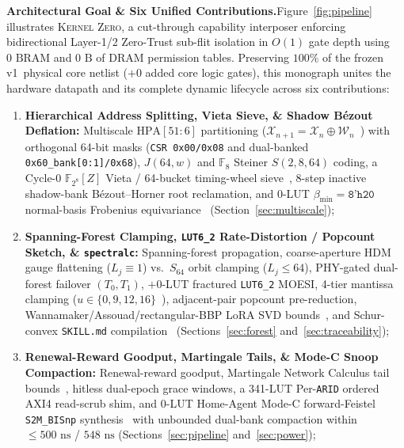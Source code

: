 \documentclass[11pt,letterpaper]{article}
\providecommand{\BaselineVersion}{v1}
\providecommand{\ScrubShimLuts}{341}
\providecommand{\ScrubShimPhysicalLUTs}{\ScrubShimLuts}
\theoremstyle{spectralthm}
\begin{document}
\noindent\textbf{Architectural Goal \& Six Unified Contributions.}\;Figure~\ref{fig:pipeline} illustrates \textsc{Kernel Zero}, a cut-through capability interposer enforcing bidirectional Layer-1/2 Zero-Trust sub-flit isolation in $O(1)$ gate depth using $0\text{~BRAM}$ and $0\text{~B}$ of DRAM permission tables. Preserving $100\%$ of the frozen \BaselineVersion\ physical core netlist ($+0$ added core logic gates), this monograph  unites the hardware datapath and its complete dynamic lifecycle across six contributions:
\begin{enumerate}
\renewcommand{\theenumi}{(\arabic{enumi})}\renewcommand{\labelenumi}{\theenumi}
  \item \textbf{Hierarchical Address Splitting, Vieta Sieve, \& Shadow B\'{e}zout Deflation:} Multiscale $\mathrm{HPA}[51:6]$ partitioning ($\mathcal{X}_{n+1} = \mathcal{X}_n \oplus \mathcal{W}_n$~\cite{chen2001multilevel}) with orthogonal 64-bit masks (\texttt{CSR 0x00/0x08} and dual-banked \texttt{0x60\_bank[0:1]/0x68}), $J(64,w)$ and $\mathbb{F}_8$ Steiner $S(2,8,64)$ coding, a Cycle-0 $\mathbb{F}_{2^8}[Z]$ Vieta / 64-bucket timing-wheel sieve~\cite{varghese1997timing}, 8-step inactive shadow-bank B\'{e}zout--Horner root reclamation, and 0-LUT $\beta_{\min}=\texttt{8'h20}$ normal-basis Frobenius equivariance~\cite{mullin1989optimal, lidl1997finite, diamond2025binius} (Section~\ref{sec:multiscale});
  \item \textbf{Spanning-Forest Clamping, \texttt{LUT6\_2} Rate-Distortion / Popcount Sketch, \& \texttt{spectralc}:} Spanning-forest propagation, coarse-aperture HDM gauge flattening ($L_j \equiv 1$) vs.\ $S_{64}$ orbit clamping ($L_j \le 64$), PHY-gated dual-forest failover $(T_0,T_1)$, $+0$-LUT fractured \mbox{\texttt{LUT6\_2}} MOESI, 4-tier mantissa clamping ($u \in \{0,9,12,16\}$~\cite{rouhani2023microscaling}), adjacent-pair popcount pre-reduction, Wannamaker/Assouad/rectangular-BBP LoRA SVD bounds~\cite{wannamaker2000nonsubtractive, benaych2012singular, assouad1983deux}, and Schur-convex \texttt{SKILL.md} compilation~\cite{mcconnell2011certifying, doe2025genesis} (Sections~\ref{sec:forest} and~\ref{sec:traceability});
  \item \textbf{Renewal-Reward Goodput, Martingale Tails, \& Mode-C Snoop Compaction:} Renewal-reward goodput, Martingale Network Calculus tail bounds~\cite{poloczek2014martingale}, hitless dual-epoch grace windows, a \ScrubShimPhysicalLUTs-LUT Per-\texttt{ARID} ordered AXI4 read-scrub shim, and 0-LUT Home-Agent Mode-C forward-Feistel \texttt{S2M\_BISnp} synthesis~\cite{luby1988construct} with unbounded dual-bank compaction within $\le 500\text{~ns}$ / $548\text{~ns}$ (Sections~\ref{sec:pipeline} and~\ref{sec:power});

\end{enumerate}
\end{document}
